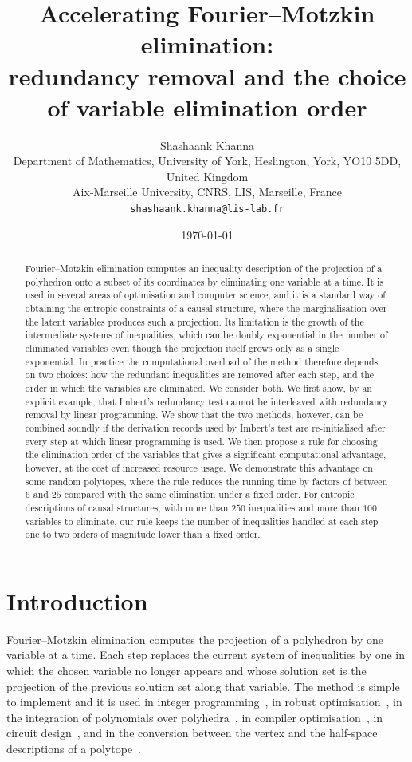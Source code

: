 \documentclass[11pt]{article}
\title{Accelerating Fourier--Motzkin elimination:\\ redundancy removal and the choice of variable elimination order}
\author{Shashaank Khanna\\[3pt]
\small Department of Mathematics, University of York, Heslington, York, YO10 5DD, United Kingdom\\
\small Aix-Marseille University, CNRS, LIS, Marseille, France\\
\small \texttt{shashaank.khanna@lis-lab.fr}}
\date{\today}
\theoremstyle{definition}
\begin{document}
\maketitle

\begin{abstract}
Fourier--Motzkin elimination computes an inequality description of the projection of a polyhedron onto a subset of its coordinates by eliminating one variable at a time. It is used in several areas of optimisation and computer science, and it is a standard way of obtaining the entropic constraints of a causal structure, where the marginalisation over the latent variables produces such a projection. Its limitation is the growth of the intermediate systems of inequalities, which can be doubly exponential in the number of eliminated variables even though the projection itself grows only as a single exponential. In practice the computational overload of the method therefore depends on two choices: how the redundant inequalities are removed after each step, and the order in which the variables are eliminated. We consider both. We first show, by an explicit example, that Imbert's redundancy test cannot be interleaved with redundancy removal by linear programming. We show that the two methods, however, can be combined soundly if the derivation records used by Imbert's test are re-initialised after every step at which linear programming is used. We then propose a rule for choosing the elimination order of the variables that gives a significant computational advantage, however, at the cost of increased resource usage. We demonstrate this advantage on some random polytopes, where the rule reduces the running time by factors of between $6$ and $25$ compared with the same elimination under a fixed order. For entropic descriptions of causal structures, with more than $250$ inequalities and more than $100$ variables to eliminate, our rule keeps the number of inequalities handled at each step one to two orders of magnitude lower than a fixed order. %
\end{abstract}

\section{Introduction}
\label{sec:intro}



Fourier--Motzkin \cite{fourier1824,motzkin1936} elimination computes the projection of a polyhedron by one variable at a time. Each step replaces the current system of inequalities by one in which the chosen variable no longer appears and whose solution set is the projection of the previous solution set along that variable. The method is simple to implement and it is used in integer programming~\cite{dantzig1972,williams1976}, in robust optimisation~\cite{zhen2018,yanikoglu2019}, in the integration of polynomials over polyhedra~\cite{baldoni2011,schechter1998}, in compiler optimisation~\cite{pouchet2008}, in circuit design~\cite{stehr2007}, and in the conversion between the vertex and the half-space descriptions of a polytope~\cite{ziegler1995}. 
\end{document}
